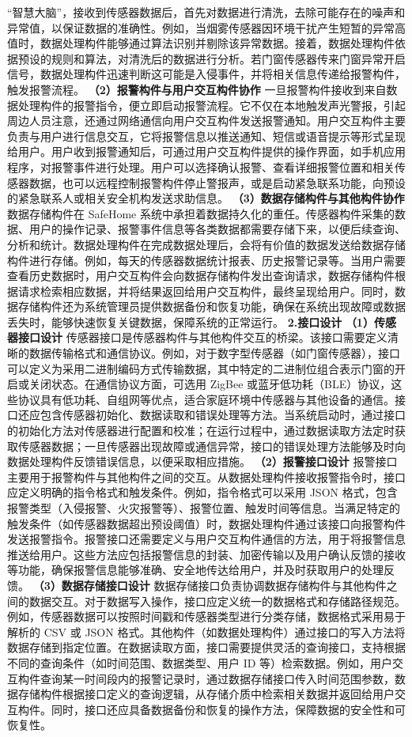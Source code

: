 ``智慧大脑''，接收到传感器数据后，首先对数据进行清洗，去除可能存在的噪声和异常值，以保证数据的准确性。例如，当烟雾传感器因环境干扰产生短暂的异常高值时，数据处理构件能够通过算法识别并剔除该异常数据。接着，数据处理构件依据预设的规则和算法，对清洗后的数据进行分析。若门窗传感器传来门窗异常开启信号，数据处理构件迅速判断这可能是入侵事件，并将相关信息传递给报警构件，触发报警流程。
\textbf{（2）报警构件与用户交互构件协作}
一旦报警构件接收到来自数据处理构件的报警指令，便立即启动报警流程。它不仅在本地触发声光警报，引起周边人员注意，还通过网络通信向用户交互构件发送报警通知。用户交互构件主要负责与用户进行信息交互，它将报警信息以推送通知、短信或语音提示等形式呈现给用户。用户收到报警通知后，可通过用户交互构件提供的操作界面，如手机应用程序，对报警事件进行处理。用户可以选择确认报警、查看详细报警位置和相关传感器数据，也可以远程控制报警构件停止警报声，或是启动紧急联系功能，向预设的紧急联系人或相关安全机构发送求助信息。
\textbf{（3）数据存储构件与其他构件协作} 数据存储构件在 SafeHome
系统中承担着数据持久化的重任。传感器构件采集的数据、用户的操作记录、报警事件信息等各类数据都需要存储下来，以便后续查询、分析和统计。数据处理构件在完成数据处理后，会将有价值的数据发送给数据存储构件进行存储。例如，每天的传感器数据统计报表、历史报警记录等。当用户需要查看历史数据时，用户交互构件会向数据存储构件发出查询请求，数据存储构件根据请求检索相应数据，并将结果返回给用户交互构件，最终呈现给用户。同时，数据存储构件还为系统管理员提供数据备份和恢复功能，确保在系统出现故障或数据丢失时，能够快速恢复关键数据，保障系统的正常运行。
\textbf{2.接口设计} \textbf{（1）传感器接口设计}
传感器接口是传感器构件与其他构件交互的桥梁。该接口需要定义清晰的数据传输格式和通信协议。例如，对于数字型传感器（如门窗传感器），接口可以定义为采用二进制编码方式传输数据，其中特定的二进制位组合表示门窗的开启或关闭状态。在通信协议方面，可选用
ZigBee
或蓝牙低功耗（BLE）协议，这些协议具有低功耗、自组网等优点，适合家庭环境中传感器与其他设备的通信。接口还应包含传感器初始化、数据读取和错误处理等方法。当系统启动时，通过接口的初始化方法对传感器进行配置和校准；在运行过程中，通过数据读取方法定时获取传感器数据；一旦传感器出现故障或通信异常，接口的错误处理方法能够及时向数据处理构件反馈错误信息，以便采取相应措施。
\textbf{（2）报警接口设计} 报警接口主要用于报警构件与其他构件之间的交互。从数据处理构件接收报警指令时，接口应定义明确的指令格式和触发条件。例如，指令格式可以采用 JSON
格式，包含报警类型（入侵报警、火灾报警等）、报警位置、触发时间等信息。当满足特定的触发条件（如传感器数据超出预设阈值）时，数据处理构件通过该接口向报警构件发送报警指令。报警接口还需要定义与用户交互构件通信的方法，用于将报警信息推送给用户。这些方法应包括报警信息的封装、加密传输以及用户确认反馈的接收等功能，确保报警信息能够准确、安全地传达给用户，并及时获取用户的处理反馈。
\textbf{（3）数据存储接口设计} 数据存储接口负责协调数据存储构件与其他构件之间的数据交互。对于数据写入操作，接口应定义统一的数据格式和存储路径规范。例如，传感器数据可以按照时间戳和传感器类型进行分类存储，数据格式采用易于解析的
CSV 或 JSON 格式。其他构件（如数据处理构件）通过接口的写入方法将数据存储到指定位置。在数据读取方面，接口需要提供灵活的查询接口，支持根据不同的查询条件（如时间范围、数据类型、用户 ID
等）检索数据。例如，用户交互构件查询某一时间段内的报警记录时，通过数据存储接口传入时间范围参数，数据存储构件根据接口定义的查询逻辑，从存储介质中检索相关数据并返回给用户交互构件。同时，接口还应具备数据备份和恢复的操作方法，保障数据的安全性和可恢复性。
